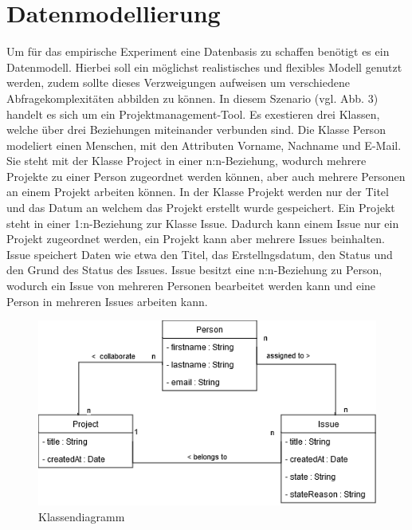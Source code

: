\chapter{Datenmodellierung} %
\label{sec:datamodelling}
Um für das empirische Experiment eine Datenbasis zu schaffen benötigt es ein Datenmodell. Hierbei soll ein möglichst realistisches und flexibles Modell genutzt werden, zudem sollte dieses Verzweigungen aufweisen um verschiedene Abfragekomplexitäten abbilden zu können. In diesem Szenario (vgl. Abb. 3) handelt es sich um ein Projektmanagement-Tool. Es exestieren drei Klassen, welche über drei Beziehungen miteinander verbunden sind. Die Klasse Person modeliert einen Menschen, mit den Attributen Vorname, Nachname und E-Mail. Sie steht mit der Klasse Project in einer n:n-Beziehung, wodurch mehrere Projekte zu einer Person zugeordnet werden können, aber auch mehrere Personen an einem Projekt arbeiten können. In der Klasse Projekt werden nur der Titel und das Datum an welchem das Projekt erstellt wurde gespeichert. Ein Projekt steht in einer 1:n-Beziehung zur Klasse Issue. Dadurch kann einem Issue nur ein Projekt zugeordnet werden, ein Projekt kann aber mehrere Issues beinhalten. Issue speichert Daten wie etwa den Titel, das Erstellngsdatum, den Status und den Grund des Status des Issues. Issue besitzt eine n:n-Beziehung zu Person, wodurch ein Issue von mehreren Personen bearbeitet werden kann und eine Person in mehreren Issues arbeiten kann.
\vspace{1cm}
\label{sec:datenmodell}
\begin{figure}[h!]
	\centering
	\includegraphics[scale=.8]{Illustrations/class_diagram.png}
	\caption{Klassendiagramm}
\end{figure}




